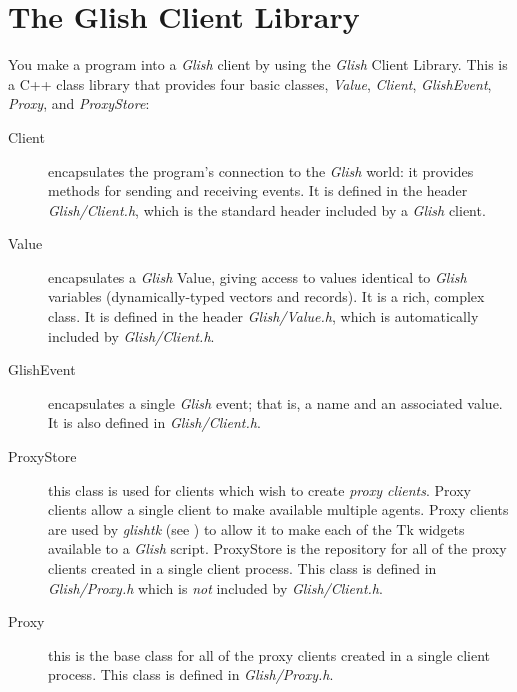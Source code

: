 
\chapter{The Glish Client Library}
\label{client-lib}

You make a program into a {\em Glish} client by using the {\em Glish} 
Client Library.
This is a C++ class library that provides four basic classes, {\em Value},
{\em Client}, {\em GlishEvent\/}, {\em Proxy}, and {\em ProxyStore}:
\begin{description}

\item[Client] encapsulates the program's connection to the {\em Glish}
world: it
provides methods for sending and receiving events.  It is defined in the
header {\em Glish/Client.h}, which is the standard header included by
a {\em Glish} client.

\item[Value] encapsulates a {\em Glish} Value,
giving access to values identical to {\em Glish} 
variables (dynamically-typed
vectors and records).  It is a rich, complex class.
It is defined in the header {\em Glish/Value.h}, which is automatically
included by {\em Glish/Client.h}.

\item[GlishEvent] encapsulates a single {\em Glish} event; that is, a name and
an associated value.  It is also defined in {\em Glish/Client.h}.

\item[ProxyStore] this class is used for clients which wish to create {\em proxy
clients}. Proxy clients allow a single client to make available multiple agents.
Proxy clients are used by {\em glishtk} (see ) to allow it to make
each of the Tk widgets available to a {\em Glish} script. ProxyStore is the
repository for all of the proxy clients created in a single client process.
This class is defined in {\em Glish/Proxy.h} which is {\em not} included
by {\em Glish/Client.h}.

\item[Proxy] this is the base class for all of the proxy clients created
in a single client process. This class is defined in {\em Glish/Proxy.h}.

\end{description}

